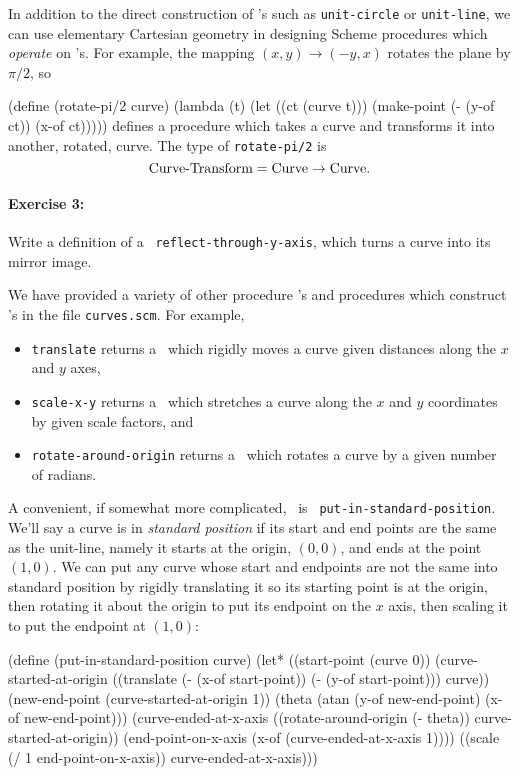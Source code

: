 In addition to the direct construction of \CRV's such as {\tt unit-circle}
or {\tt unit-line}, we can use elementary Cartesian geometry in designing
Scheme procedures which {\em operate} on \CRV's.  For example, the mapping
$(x,y)\longrightarrow (-y,x)$ rotates the plane by $\pi/2$, so

\beginlisp
(define (rotate-pi/2 curve)
  (lambda (t)
    (let ((ct (curve t)))
      (make-point
       (- (y-of ct))
       (x-of ct)))))
\endlisp
defines a procedure which takes a curve and transforms it into another,
rotated, curve.  The type of {\tt rotate-pi/2} is
\[\mbox{Curve-Transform} = \mbox{Curve} \rightarrow \mbox{Curve}.\]

\paragraph{Exercise 3:}
Write a definition of a \UT\ {\tt reflect-through-y-axis}, which turns a
curve into its mirror image.

\medskip

We have provided a variety of other procedure \UT's and procedures which
construct \UT's in the file {\tt curves.scm}.  For example,
\begin{itemize}

\item 
{\tt translate} returns a \UT\ which rigidly moves a curve given distances
along the $x$ and $y$ axes,

\item {\tt scale-x-y}
returns a \UT\ which stretches a curve along the $x$ and $y$ coordinates
by given scale factors, and

\item {\tt rotate-around-origin}
returns a \UT\ which rotates a curve by a given number of radians.

\end{itemize}
A convenient, if somewhat more complicated, \UT\ is {\tt
put-in-standard-position}.  We'll say a curve is in {\em standard
position} if its start and end points are the same as the unit-line,
namely it starts at the origin, $(0,0)$, and ends at the point $(1,0)$.
We can put any curve whose start and endpoints are not the same into
standard position by rigidly translating it so its starting point is at
the origin, then rotating it about the origin to put its endpoint on the
$x$ axis, then scaling it to put the endpoint at $(1,0)$:

\beginlisp
(define (put-in-standard-position curve)
  (let* ((start-point (curve 0))
         (curve-started-at-origin
          ((translate (- (x-of start-point))
                      (- (y-of start-point)))
           curve))
         (new-end-point (curve-started-at-origin 1))
         (theta (atan (y-of new-end-point) (x-of new-end-point)))
         (curve-ended-at-x-axis
          ((rotate-around-origin (- theta)) curve-started-at-origin))
         (end-point-on-x-axis (x-of (curve-ended-at-x-axis 1))))
    ((scale (/ 1 end-point-on-x-axis)) curve-ended-at-x-axis)))
\endlisp

